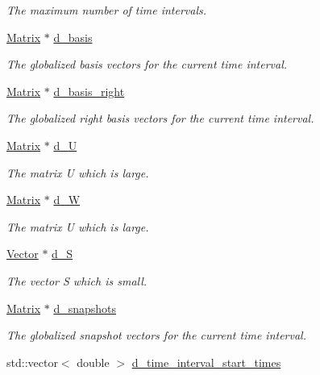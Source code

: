 \begin{DoxyCompactItemize}
\begin{DoxyCompactList}\small\item\em The maximum number of time intervals. \end{DoxyCompactList}\item 
\hyperlink{class_c_a_r_o_m_1_1_matrix}{Matrix} $\ast$ \hyperlink{class_c_a_r_o_m_1_1_s_v_d_a01470350e59cca179cf019c194cb2fef}{d\-\_\-basis}
\begin{DoxyCompactList}\small\item\em The globalized basis vectors for the current time interval. \end{DoxyCompactList}\item 
\hyperlink{class_c_a_r_o_m_1_1_matrix}{Matrix} $\ast$ \hyperlink{class_c_a_r_o_m_1_1_s_v_d_a49f5c427062049cea8a815afbec966fe}{d\-\_\-basis\-\_\-right}
\begin{DoxyCompactList}\small\item\em The globalized right basis vectors for the current time interval. \end{DoxyCompactList}\item 
\hyperlink{class_c_a_r_o_m_1_1_matrix}{Matrix} $\ast$ \hyperlink{class_c_a_r_o_m_1_1_s_v_d_a8b9b2af990f5ced830dc37826a256491}{d\-\_\-\-U}
\begin{DoxyCompactList}\small\item\em The matrix U which is large. \end{DoxyCompactList}\item 
\hyperlink{class_c_a_r_o_m_1_1_matrix}{Matrix} $\ast$ \hyperlink{class_c_a_r_o_m_1_1_s_v_d_adb215548e00558097e34d4afad15035b}{d\-\_\-\-W}
\begin{DoxyCompactList}\small\item\em The matrix U which is large. \end{DoxyCompactList}\item 
\hyperlink{class_c_a_r_o_m_1_1_vector}{Vector} $\ast$ \hyperlink{class_c_a_r_o_m_1_1_s_v_d_a7e09dc0fc7a80f3718ba9da22406c4cb}{d\-\_\-\-S}
\begin{DoxyCompactList}\small\item\em The vector S which is small. \end{DoxyCompactList}\item 
\hyperlink{class_c_a_r_o_m_1_1_matrix}{Matrix} $\ast$ \hyperlink{class_c_a_r_o_m_1_1_s_v_d_a1a38d353f58b9d825ff23197a3a1a879}{d\-\_\-snapshots}
\begin{DoxyCompactList}\small\item\em The globalized snapshot vectors for the current time interval. \end{DoxyCompactList}\item 
\hypertarget{class_c_a_r_o_m_1_1_s_v_d_aeb7b11d0eaf47d84e38f15b3f285a579}{std\-::vector$<$ double $>$ \hyperlink{class_c_a_r_o_m_1_1_s_v_d_aeb7b11d0eaf47d84e38f15b3f285a579}{d\-\_\-time\-\_\-interval\-\_\-start\-\_\-times}}\label{class_c_a_r_o_m_1_1_s_v_d_aeb7b11d0eaf47d84e38f15b3f285a579}


\end{DoxyCompactItemize}
